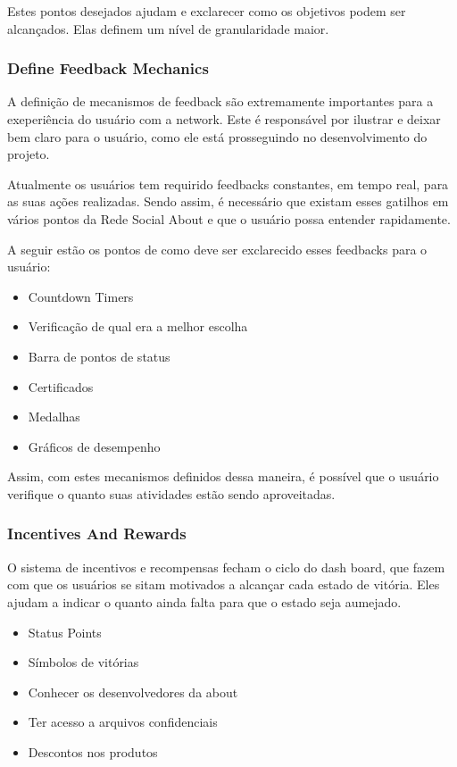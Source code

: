 Estes pontos desejados ajudam e exclarecer como os objetivos podem ser alcançados. Elas 
definem um nível de granularidade maior.

\subsubsection{Define Feedback Mechanics}
\label{sub:define_feedback_mechanics}
A definição de mecanismos de feedback são extremamente importantes para a exeperiência 
do usuário
com a network. Este é responsável por ilustrar e deixar bem claro para o usuário, como 
ele está prosseguindo no desenvolvimento do projeto.

Atualmente os usuários tem requirido feedbacks constantes, em tempo real, para as suas 
ações
realizadas. Sendo assim, é necessário que existam esses gatilhos em vários pontos da
Rede Social About e que o usuário possa entender rapidamente.

A seguir estão os pontos  de como deve ser exclarecido esses feedbacks para o 
usuário:

\begin{itemize}
    \item Countdown Timers
    \item Verificação de qual era a melhor escolha
    \item Barra de pontos de status
    \item Certificados
    \item Medalhas
    \item Gráficos de desempenho
\end{itemize}

Assim, com estes mecanismos definidos dessa maneira, é possível que o usuário verifique 
o quanto suas atividades estão sendo aproveitadas.

\subsubsection{Incentives And Rewards}
\label{sub:incentives_and_rewards}
O sistema de incentivos e recompensas fecham o ciclo do dash board, que fazem com que 
os usuários se sitam motivados a alcançar cada estado de vitória. Eles ajudam a indicar
o quanto ainda falta para que o estado seja aumejado.

\begin{itemize}
    \item Status Points
    \item Símbolos de vitórias
    \item Conhecer os desenvolvedores da about
    \item Ter acesso a arquivos confidenciais
    \item Descontos nos produtos
\end{itemize}

